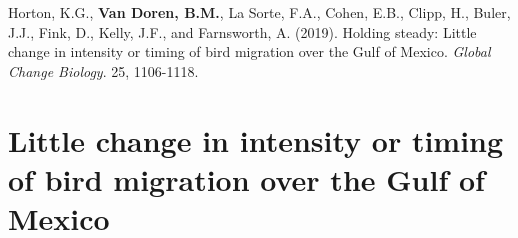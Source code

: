 \documentclass[a4paper, nobind]{templates/ociamthesis}
\begin{document}
\begin{savequote}
Horton, K.G., \textbf{Van Doren, B.M.}, La Sorte, F.A., Cohen, E.B.,
Clipp, H., Buler, J.J., Fink, D., Kelly, J.F., and Farnsworth, A.
(2019). Holding steady: Little change in intensity or timing of bird
migration over the Gulf of Mexico. \emph{Global Change Biology}. 25,
1106-1118.
\end{savequote}

\hypertarget{app-gulf}{
\chapter[Timing and intensity of bird migration over the Gulf of Mexico]{Little change in intensity or timing of bird migration over the Gulf of Mexico}\label{app-gulf}}

\newpage
\end{document}
